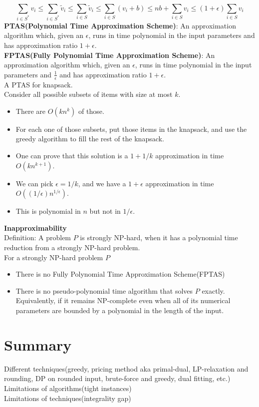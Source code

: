 \documentclass[onecolumn]{report}
\begin{document}
\begin{equation*}
    \sum_{i \in S^*} v_i \leq \sum_{i \in S^*} \tilde{v}_i \leq \sum_{i \in S} \tilde{v}_i \leq \sum_{i \in S} (v_i + b) \leq nb+\sum_{i \in S} v_i \leq (1+\epsilon)\sum_{i \in S} v_i
\end{equation*}
\textbf{PTAS(Polynomial Time Approximation Scheme)}: An approximation algorithm which, given an $\epsilon$, runs in time polynomial in the input parameters and has approximation ratio $1+\epsilon$.\\
\textbf{FPTAS(Fully Polynomial Time Approximation Scheme)}: An approximation algorithm which, given an $\epsilon$, runs in time polynomial in the input parameters and $\frac{1}{\epsilon}$ and has approximation ratio $1+\epsilon$.\\
A PTAS for knapsack.\\
Consider all possible subsets of items with size at most $k$.
\begin{itemize}
    \item There are $O(kn^k)$ of those.
    \item For each one of those subsets, put those items in the knapsack, and use the greedy algorithm to fill the rest of the knapsack.
    \item One can prove that this solution is a $1+1/k$ approximation in time $O(kn^{k+1})$.
    \item We can pick $\epsilon=1/k$, and we have a $1+\epsilon$ approximation in time $O((1/\epsilon)n^{1/\epsilon})$.
    \item This is polynomial in $n$ but not in $1/\epsilon$.
\end{itemize}
\textbf{Inapproximability}\\
Definition: A problem $P$ is strongly NP-hard, when it has a polynomial time reduction from a strongly NP-hard problem.\\
For a strongly NP-hard problem $P$
\begin{itemize}
    \item There is no Fully Polynomial Time Approximation Scheme(FPTAS)
    \item There is no pseudo-polynomial time algorithm that solves $P$ exactly.
    \subitem Equivalently, if it remains NP-complete even when all of its numerical parameters are bounded by a polynomial in the length of the input.
\end{itemize}

\section{Summary}
Different techniques(greedy, pricing method aka primal-dual, LP-relaxation and rounding, DP on rounded input, brute-force and greedy, dual fitting, etc.)\\
Limitations of algorithms(tight instances)\\
Limitations of techniques(integrality gap)\\
\end{document}
